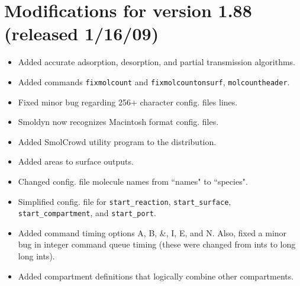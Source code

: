 \documentclass {scrbook}
\newcommand {\ttt} {\texttt}
\begin{document}
\section{Modifications for version 1.88 (released 1/16/09)}
\begin{itemize}
\item Added accurate adsorption, desorption, and partial transmission algorithms.
\item Added commands \ttt{fixmolcount} and \ttt{fixmolcountonsurf}, \ttt{molcountheader}.
\item Fixed minor bug regarding 256+ character config. files lines.
\item Smoldyn now recognizes Macintosh format config. files.
\item Added SmolCrowd utility program to the distribution.
\item Added areas to surface outputs.
\item Changed config. file molecule names from ``names" to ``species".
\item Simplified config. file for \ttt{start\_reaction}, \ttt{start\_surface}, \ttt{start\_compartment}, and \ttt{start\_port}.
\item Added command timing options A, B, \&, I, E, and N. Also, fixed a minor bug in integer command queue timing (these were changed from ints to long long ints).
\item Added compartment definitions that logically combine other compartments.
\end{itemize}
\end{document}
